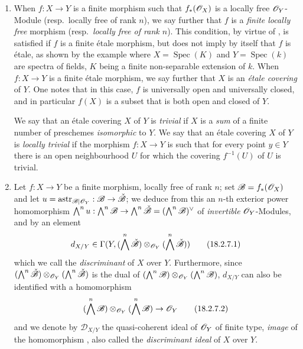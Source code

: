 \begin{remarks}[18.2.7]
\label{IV.18.2.7}
\begin{enumerate}
  \item[(i)] When $f:X\to Y$ is a finite morphism such that $f_*(\mathscr{O}_X)$ is a locally free $\mathscr{O}_Y$-Module (resp.\ locally free of rank $n$), we say further that $f$ is a \emph{finite locally free} morphism (resp.\ \emph{locally free of rank $n$}).
This condition, by virtue of , is satisfied if $f$ is a finite \'etale morphism, but does not imply by itself that $f$ is \'etale, as shown by the example where $X=\operatorname{Spec}(K)$ and $Y=\operatorname{Spec}(k)$ are spectra of fields, $K$ being a finite non-separable extension of $k$.
When $f:X\to Y$ is a finite \'etale morphism, we say further that $X$ is an \emph{\'etale covering} of $Y$.
One notes that in this case, $f$ is universally open and universally closed, and in particular $f(X)$ is a subset that is both open and closed of $Y$.

We say that an \'etale covering $X$ of $Y$ is \emph{trivial} if $X$ is a \emph{sum} of a finite number of preschemes \emph{isomorphic} to $Y$.
We say that an \'etale covering $X$ of $Y$ is \emph{locally trivial} if the morphism $f:X\to Y$ is such that for every point $y\in Y$ there is an open neighbourhood $U$ for which the covering $f^{-1}(U)$ of $U$ is trivial.

  \item[(ii)] Let $f:X\to Y$ be a finite morphism, locally free of rank $n$;
set $\mathscr{B}=f_*(\mathscr{O}_X)$ and let $u=\operatorname{astr}_{\mathscr{B}|\mathscr{O}_Y}:\mathscr{B}\to\check{\mathscr{B}}$;
we deduce from this an $n$-th exterior power homomorphism
$\bigwedge^n u:\bigwedge^n\mathscr{B}\to\bigwedge^n\check{\mathscr{B}}=(\bigwedge^n\mathscr{B})^\vee$ of \emph{invertible} $\mathscr{O}_Y$-Modules, and by  an element
\[
\label{IV.18.2.7.1}
d_{X/Y}\in\Gamma(Y,(\bigwedge^n\check{\mathscr{B}})\otimes_{\mathscr{O}_Y}(\bigwedge^n\check{\mathscr{B}}))
\tag{18.2.7.1}
\]
which we call the \emph{discriminant} of $X$ over $Y$.
Furthermore, since $(\bigwedge^n\check{\mathscr{B}})\otimes_{\mathscr{O}_Y}(\bigwedge^n\check{\mathscr{B}})$ is the dual of $(\bigwedge^n\mathscr{B})\otimes_{\mathscr{O}_Y}(\bigwedge^n\mathscr{B})$, $d_{X/Y}$ can also be identified with a homomorphism
\[
\label{IV.18.2.7.2}
(\bigwedge^n\mathscr{B})\otimes_{\mathscr{O}_Y}(\bigwedge^n\mathscr{B})\to\mathscr{O}_Y
\tag{18.2.7.2}
\]
and we denote by $\mathscr{D}_{X/Y}$ the quasi-coherent ideal of $\mathscr{O}_Y$ of finite type, \emph{image} of the homomorphism , also called the \emph{discriminant ideal} of $X$ over $Y$.
\end{enumerate}
\end{remarks}

